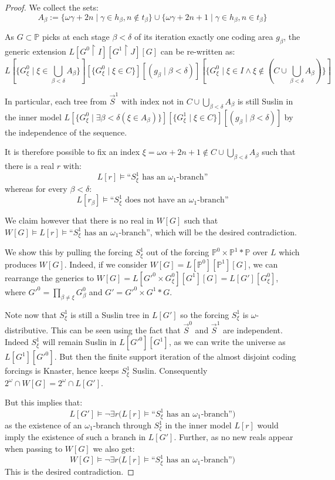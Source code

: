 \documentclass[10pt,a4paper]{amsart}
\begin{document}
\begin{proof}
We collect the sets:
$$A_{\beta} := \{\omega \gamma +2n \mid \gamma \in h_{\beta}, n \notin t_{\beta}\} \cup \{\omega \gamma + 2n+1 \mid \gamma \in h_{\beta}, n \in t_{\beta}\}$$

As $G \subset \mathbb{P}$ picks at each stage $\beta < \delta$ of its iteration exactly one coding area $g_{\beta}$, the generic extension $L[G^0 \restriction I][G^1 \restriction J][G]$ can be re-written as:
$$L[\{G^0_{\xi} \mid \xi \in \bigcup_{\beta < \delta} A_{\beta}\}][\{G^0_{\xi} \mid \xi \in C\}][(g_{\beta} \mid \beta < \delta)][\{G^0_{\xi} \mid \xi \in I \land \xi \notin (C \cup \bigcup_{\beta <\delta} A_{\beta})\}]$$

In particular, each tree from $\vec{S}^1$ with index not in $C \cup \bigcup_{\beta <\delta} A_{\beta}$ is still Suslin in the inner model $L[\{G^0_{\xi} \mid \exists \beta < \delta (\xi \in A_{\beta})\}][\{G^1_{\xi} \mid \xi \in C\}][(g_{\beta} \mid \beta < \delta)]$ by the independence of the sequence.

It is therefore possible to fix an index $\xi = \omega \alpha + 2n+1 \notin C \cup \bigcup_{\beta <\delta} A_{\beta}$ such that there is a real $r$ with:
$$L[r] \models \text{``}S^1_\xi \text{ has an } \omega_1\text{-branch''}$$
whereas for every $\beta < \delta$:
$$L[r_{\beta}] \models \text{``}S^1_\xi \text{ does not have an } \omega_1\text{-branch''}$$

We claim however that there is no real in $W[G]$ such that $W[G] \models L[r] \models \text{``}S^1_\xi \text{ has an } \omega_1\text{-branch''}$, which will be the desired contradiction.

We show this by pulling the forcing $S^1_\xi$ out of the forcing $\mathbb{P}^0 \times \mathbb{P}^1 \ast \mathbb{P}$ over $L$ which produces $W[G]$. Indeed, if we consider $W[G]=L[\mathbb{P}^0][\mathbb{P}^1][G]$, we can rearrange the generics to $W[G]= L[G'^0 \times G^0_\xi][G^1][G] = L[G'][G^0_\xi]$, where $G'^0 = \prod_{\beta \ne \xi} G^0_{\beta}$ and $G' = G'^0 \times G^1 \ast G$.

Note now that $S^1_\xi$ is still a Suslin tree in $L[G']$ so the forcing $S^1_\xi$ is $\omega$-distributive. This can be seen using the fact that $\vec{S}^0$ and $\vec{S}^1$ are independent. Indeed $S^1_\xi$ will remain Suslin in $L[G'^0][G^1]$, as we can write the universe as $L[G^1][G'^0]$. But then the finite support iteration of the almost disjoint coding forcings is Knaster, hence keeps $S^1_\xi$ Suslin. Consequently $2^{\omega} \cap W[G] = 2^{\omega} \cap L[G']$.

But this implies that:
$$L[G'] \models \neg \exists r \big( L[r] \models \text{``}S^1_\xi \text{ has an } \omega_1\text{-branch''} \big)$$
as the existence of an $\omega_1$-branch through $S^1_\xi$ in the inner model $L[r]$ would imply the existence of such a branch in $L[G']$. Further, as no new reals appear when passing to $W[G]$ we also get:
$$W[G] \models \neg \exists r \big( L[r] \models \text{``}S^1_\xi \text{ has an } \omega_1\text{-branch''} \big)$$
This is the desired contradiction.
\end{proof}
\end{document}
